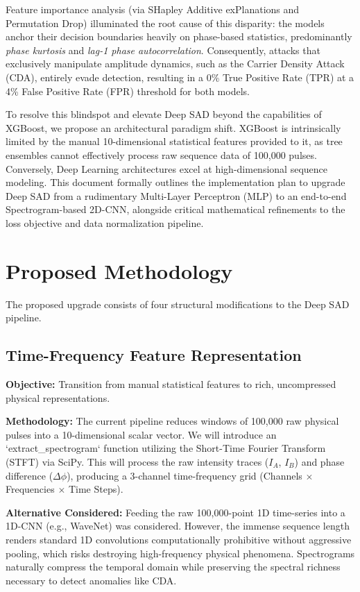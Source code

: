 \documentclass[10pt, conference]{IEEEtran}
\begin{document}
Feature importance analysis (via SHapley Additive exPlanations and Permutation Drop) illuminated the root cause of this disparity: the models anchor their decision boundaries heavily on phase-based statistics, predominantly \textit{phase kurtosis} and \textit{lag-1 phase autocorrelation}. Consequently, attacks that exclusively manipulate amplitude dynamics, such as the Carrier Density Attack (CDA), entirely evade detection, resulting in a 0\% True Positive Rate (TPR) at a 4\% False Positive Rate (FPR) threshold for both models. 

To resolve this blindspot and elevate Deep SAD beyond the capabilities of XGBoost, we propose an architectural paradigm shift. XGBoost is intrinsically limited by the manual 10-dimensional statistical features provided to it, as tree ensembles cannot effectively process raw sequence data of 100,000 pulses. Conversely, Deep Learning architectures excel at high-dimensional sequence modeling. This document formally outlines the implementation plan to upgrade Deep SAD from a rudimentary Multi-Layer Perceptron (MLP) to an end-to-end Spectrogram-based 2D-CNN, alongside critical mathematical refinements to the loss objective and data normalization pipeline.

\section{Proposed Methodology}

The proposed upgrade consists of four structural modifications to the Deep SAD pipeline.

\subsection{Time-Frequency Feature Representation}
\textbf{Objective:} Transition from manual statistical features to rich, uncompressed physical representations.

\textbf{Methodology:} The current pipeline reduces windows of 100,000 raw physical pulses into a 10-dimensional scalar vector. We will introduce an `extract_spectrogram` function utilizing the Short-Time Fourier Transform (STFT) via SciPy. This will process the raw intensity traces ($I_A$, $I_B$) and phase difference ($\Delta\phi$), producing a 3-channel time-frequency grid (Channels $\times$ Frequencies $\times$ Time Steps).

\textbf{Alternative Considered:} Feeding the raw 100,000-point 1D time-series into a 1D-CNN (e.g., WaveNet) was considered. However, the immense sequence length renders standard 1D convolutions computationally prohibitive without aggressive pooling, which risks destroying high-frequency physical phenomena. Spectrograms naturally compress the temporal domain while preserving the spectral richness necessary to detect anomalies like CDA.
\end{document}
